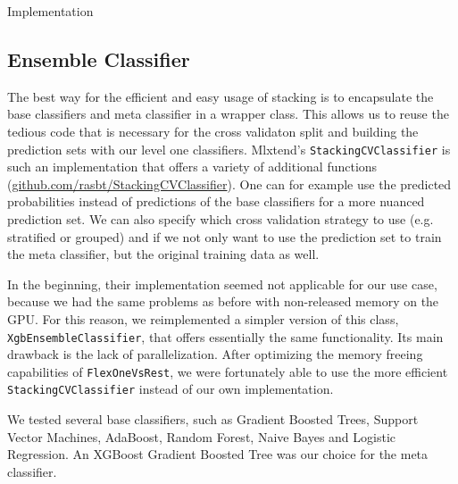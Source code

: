 \begin{section}{Implementation}
\subsection{Ensemble Classifier}

The best way for the efficient and easy usage of stacking is to encapsulate the base classifiers and meta classifier in a wrapper class. This allows us to reuse the tedious code that is necessary for the cross validaton split and building the prediction sets with our level one classifiers. Mlxtend's \texttt{StackingCVClassifier} is such an implementation that offers a variety of additional functions (\href{http://rasbt.github.io/mlxtend/user_guide/classifier/StackingCVClassifier/}{github.com/rasbt/StackingCVClassifier}). One can for example use the predicted probabilities instead of predictions of the base classifiers for a more nuanced prediction set. We can also specify which cross validation strategy to use (e.g. stratified or grouped) and if we not only want to use the prediction set to train the meta classifier, but the original training data as well.

In the beginning, their implementation seemed not applicable for our use case, because we had the same problems as before with non-released memory on the GPU. For this reason, we reimplemented a simpler version of this class, \texttt{XgbEnsembleClassifier}, that offers essentially the same functionality. Its main drawback is the lack of parallelization. After optimizing the memory freeing capabilities of \texttt{FlexOneVsRest}, we were fortunately able to use the more efficient \texttt{StackingCVClassifier} instead of our own implementation.

We tested several base classifiers, such as Gradient Boosted Trees, Support Vector Machines, AdaBoost, Random Forest, Naive Bayes and Logistic Regression. An XGBoost Gradient Boosted Tree was our choice for the meta classifier.

\end{section}
